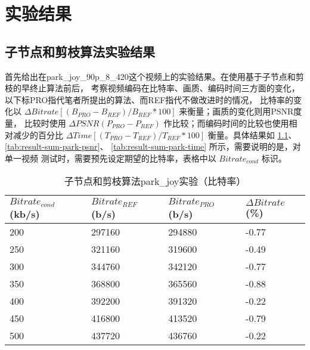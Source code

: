\chapter{实验结果}
\label{cha:result}

\section{子节点和剪枝算法实验结果}

首先给出在park\_joy\_90p\_8\_420这个视频上的实验结果。在使用基于子节点和剪枝的早终止算法前后，
考察视频编码在比特率、画质、编码时间三方面的变化，以下标PRO指代笔者所提出的算法、而REF指代不做改进时的情况，
比特率的变化以 $\Delta Bitrate[ (B_{PRO} - B_{REF})/B_{REF} * 100 ]$ 来衡量；画质的变化则用PSNR度量，
比较时使用 $ \Delta PSNR(P_{PRO} - P_{REF})$ 作比较；而编码时间的比较也使用相对减少的百分比
 $ \Delta Time[ (T_{PRO} - T_{REF})/T_{REF} * 100 ]$ 衡量。具体结果如 \ref{tab:result-sum-park-bitrate}、
\ref{tab:result-sum-park-psnr}、 \ref{tab:result-sum-park-time} 所示，需要说明的是，对单一视频
测试时，需要预先设定期望的比特率，表格中以 $Bitrate_{cond}$ 标识。

\begin{table}[H]
  \centering
    \caption{子节点和剪枝算法park\_joy实验（比特率）}
    \label{tab:result-sum-park-bitrate}
    \begin{tabularx}{\linewidth}{XXXX}
      \toprule[1.5pt]
      $Bitrate_{cond}$(kb/s) & $Bitrate_{REF}$(b/s) & $Bitrate_{PRO}$(b/s) & $\Delta Bitrate$(\%) \\
      \midrule[1pt]
      200 & 297160 & 294880 & -0.77  \\
      250 & 321160 & 319600 & -0.49 \\
      300 & 344760 & 342120 & -0.77  \\
      350 & 368800 & 365560 & -0.88 \\
      400 & 392200 & 391320 & -0.22  \\
      450 & 416800 & 413520 & -0.79 \\
      500 & 437720 & 436760 & -0.22  \\
      \bottomrule[1.5pt]
    \end{tabularx}
\end{table}

